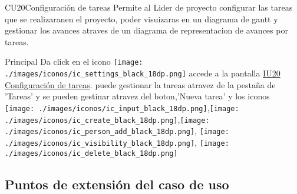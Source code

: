 \begin{UseCase}{CU20}{Configuración de tareas}{
		Permite al Lider de proyecto configurar las tareas que se realizaranen el proyecto, poder visuizaras en un diagrama de gantt y gestionar los avances atraves de un diagrama de representacion de avances por tareas.
	}
	\end{UseCase}
	\begin{UCtrayectoria}{Principal}
		\UCpaso[\UCactor] Da click en el icono \texttt{[image: ./images/iconos/ic\_settings\_black\_18dp.png]}
        \UCpaso [\UCsist] accede a la pantalla \hyperref[fig:IU20]{IU20 Configuración de tareas}.
        \UCpaso [\UCactor] puede gestionar la tareas atravez de la pestaña de 'Tareas' y se pueden gestinar atravez del boton,'Nueva tarea' y los iconos \texttt{[image: ./images/iconos/ic\_input\_black\_18dp.png]},\texttt{[image: ./images/iconos/ic\_create\_black\_18dp.png]},\texttt{[image: ./images/iconos/ic\_person\_add\_black\_18dp.png]},
\texttt{[image: ./images/iconos/ic\_visibility\_black\_18dp.png]},
\texttt{[image: ./images/iconos/ic\_delete\_black\_18dp.png]} \label{item:cu20Item1}       
        
	\end{UCtrayectoria}
\subsection{Puntos de extensión del caso de uso}


